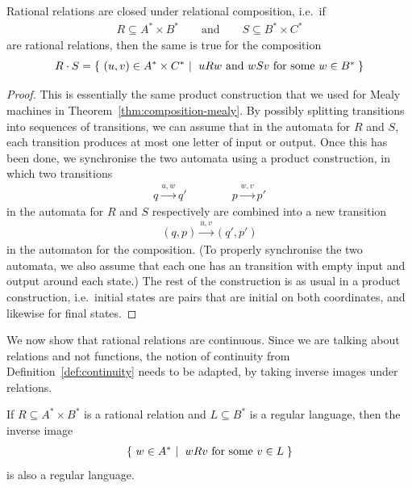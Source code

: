 \begin{theorem}\label{thm:composition-rational-relations}
    Rational relations are closed under relational composition, i.e.~if 
    \begin{align*}
    R \subseteq A^* \times B^* 
    \qquad 
    \text{and}
    \qquad 
    S \subseteq B^* \times C^*
    \end{align*}
    are rational relations, then the same is true for the composition
    \begin{align*}
    R \cdot S = \setbuild{ (u,v) \in A^* \times C^*}{ $u R w$ and $w S v$ for some  $w \in B^*$}
    \end{align*}
\end{theorem}

\begin{proof}
    This is essentially the same product  construction that we used for Mealy machines in Theorem~\ref{thm:composition-mealy}. By possibly splitting transitions into sequences of transitions, we can assume that in the automata for $R$ and $S$, each transition produces at most one letter of input or output. Once this has been done, we synchronise the  two automata using  a product construction, in which two transitions
    \begin{align*}
q \xrightarrow{u,w} q' \qquad  \qquad 
    p \xrightarrow{w,v} p'
    \end{align*}
    in the automata  for $R$ and $S$ respectively
    are combined into a new transition 
    \begin{align*}
    (q,p) \xrightarrow{u,v} (q',p')\end{align*} in the automaton for the composition. (To properly synchronise the two automata, we also assume that each one has an transition with empty input and output around each state.)
    The rest of the construction is as usual in a product construction, i.e.~initial states are pairs that are initial on both coordinates, and likewise for final states.
\end{proof}

We now show that rational relations are continuous. Since we are talking about relations and not functions, the notion of continuity from Definition~\ref{def:continuity} needs to be adapted, by taking inverse images under relations.

\begin{theorem}\label{thm:continuity-rational-relations}
    If $R \subseteq A^* \times B^*$ is a rational relation and $L \subseteq B^*$ is a regular language, then the inverse image 
    \begin{align*}
    \setbuild{ w \in A^*}{$w R v$ for some $v \in L$}
    \end{align*}
    is also a regular language. 
\end{theorem}

